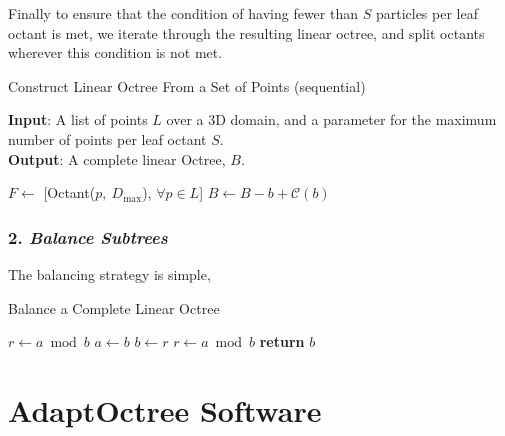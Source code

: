 \documentclass[12pt, a4, twoside]{article}
\begin{document}
 Finally to ensure that the condition of having fewer than $S$ particles per leaf octant is met, we iterate through the resulting linear octree, and split octants wherever this condition is not met.

 \begin{algorithm}
    \caption{Construct Linear Octree From a Set of Points (sequential)}\label{alg:points2octree}
    \hspace*{\algorithmicindent} \textbf{Input}: A list of points $L$ over a 3D domain, and a parameter for the maximum number of points per leaf octant $S$. \\
    \hspace*{\algorithmicindent} \textbf{Output}: A complete linear Octree, $B$.
    \begin{algorithmic}[1]
    \State $F \gets$ [Octant($p, \> D_{\max}$), $\forall p \in L$]
            \State $B \gets B - b + \mathcal{C}(b)$
        \EndIf
    \EndFor
    \EndFunction
    \end{algorithmic}
 \end{algorithm}

\subsubsection*{2. \textit{Balance Subtrees}}

The balancing strategy is simple,

\begin{algorithm}
    \caption{Balance a Complete Linear Octree}\label{euclid}
    \begin{algorithmic}[1]
    \State $r\gets a\bmod b$
    \State $a\gets b$
    \State $b\gets r$
    \State $r\gets a\bmod b$
    \EndWhile\label{euclidendwhile}
    \State \textbf{return} $b$
    \EndFunction
    \end{algorithmic}
 \end{algorithm}

\section*{AdaptOctree Software}


\printbibliography
\end{document}
